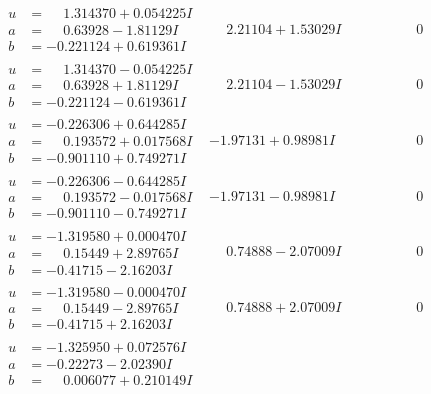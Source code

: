 \documentclass[1p]{elsarticle_modified}
\theoremstyle{definition}
\begin{document}
$$\begin{array}{c|c|c}
\begin{aligned}
u &= \phantom{-}1.314370 + 0.054225 I \\
a &= \phantom{-}0.63928 - 1.81129 I \\
b &= -0.221124 + 0.619361 I\end{aligned}
 & \phantom{-}2.21104 + 1.53029 I & \phantom{-0.000000 } 0 \\ \hline\begin{aligned}
u &= \phantom{-}1.314370 - 0.054225 I \\
a &= \phantom{-}0.63928 + 1.81129 I \\
b &= -0.221124 - 0.619361 I\end{aligned}
 & \phantom{-}2.21104 - 1.53029 I & \phantom{-0.000000 } 0 \\ \hline\begin{aligned}
u &= -0.226306 + 0.644285 I \\
a &= \phantom{-}0.193572 + 0.017568 I \\
b &= -0.901110 + 0.749271 I\end{aligned}
 & -1.97131 + 0.98981 I & \phantom{-0.000000 } 0 \\ \hline\begin{aligned}
u &= -0.226306 - 0.644285 I \\
a &= \phantom{-}0.193572 - 0.017568 I \\
b &= -0.901110 - 0.749271 I\end{aligned}
 & -1.97131 - 0.98981 I & \phantom{-0.000000 } 0 \\ \hline\begin{aligned}
u &= -1.319580 + 0.000470 I \\
a &= \phantom{-}0.15449 + 2.89765 I \\
b &= -0.41715 - 2.16203 I\end{aligned}
 & \phantom{-}0.74888 - 2.07009 I & \phantom{-0.000000 } 0 \\ \hline\begin{aligned}
u &= -1.319580 - 0.000470 I \\
a &= \phantom{-}0.15449 - 2.89765 I \\
b &= -0.41715 + 2.16203 I\end{aligned}
 & \phantom{-}0.74888 + 2.07009 I & \phantom{-0.000000 } 0 \\ \hline\begin{aligned}
u &= -1.325950 + 0.072576 I \\
a &= -0.22273 - 2.02390 I \\
b &= \phantom{-}0.006077 + 0.210149 I\end{aligned}

\end{array}$$
\end{document}
